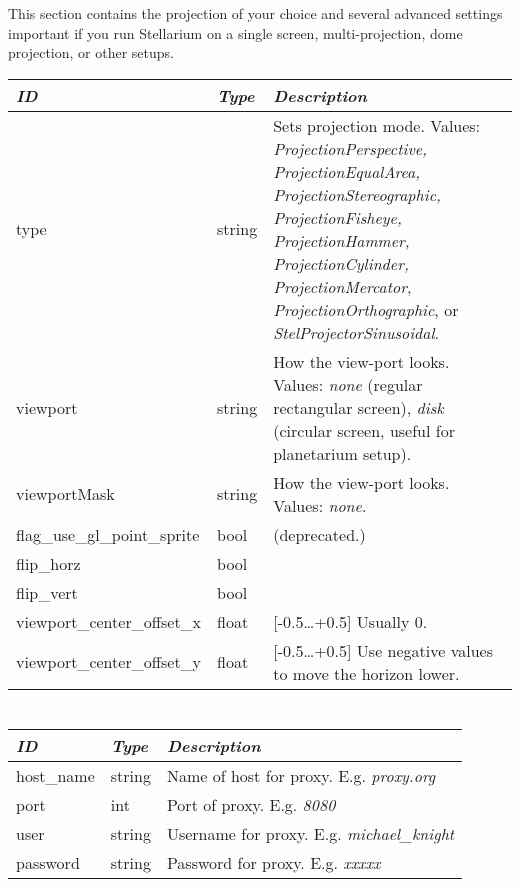 This section contains the projection of your choice and several
advanced settings important if you run Stellarium on a single screen,
multi-projection, dome projection, or other setups.

\begin{longtabu} to \textwidth {l|l|X}
\toprule
\emph{ID} & \emph{Type} & \emph{Description}\\
\midrule
type & string & Sets projection mode. Values: \emph{ProjectionPerspective,
ProjectionEqualArea, ProjectionStereographic, ProjectionFisheye,
ProjectionHammer, ProjectionCylinder, ProjectionMercator},
\emph{ProjectionOrthographic}, or \emph{StelProjectorSinusoidal}.\\
\midrule
viewport & string & How the view-port looks. Values:
\emph{none} (regular rectangular screen), \emph{disk} (circular screen, useful for planetarium setup).\\
\midrule
viewportMask & string & How the view-port looks. Values: \emph{none}.\\
\midrule
flag\_use\_gl\_point\_sprite & bool & (deprecated.)\  \\
\midrule
flip\_horz & bool & \\
\midrule
flip\_vert & bool & \\
\midrule
viewport\_center\_offset\_x & float & [-0.5\ldots+0.5] Usually 0. \\
\midrule
viewport\_center\_offset\_y & float & [-0.5\ldots+0.5] Use negative values to move the horizon lower. \\
\bottomrule
\end{longtabu}

\section{}\label{section-proxy}

\begin{longtabu} to \textwidth {l|l|X}
\toprule
\emph{ID} & \emph{Type} & \emph{Description}\\
\midrule
host\_name & string & Name of host for proxy. E.g. \emph{proxy.org}\\
\midrule
port & int & Port of proxy. E.g. \emph{8080}\\
\midrule
user & string & Username for proxy. E.g. \emph{michael\_knight}\\
\midrule
password & string & Password for proxy. E.g. \emph{xxxxx}\\
\bottomrule
\end{longtabu}

